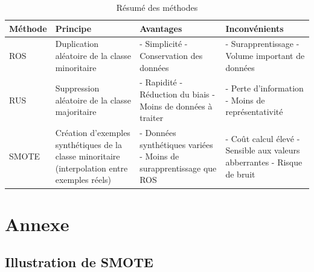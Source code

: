 \documentclass{article}
\begin{document}
\begin{table}[h!]
\centering
\begin{tabular}{|p{1.5cm}|p{4cm}|p{4.5cm}|p{4.2cm}|}
\hline

\centering
\textbf{Méthode} & \textbf{Principe} & \textbf{Avantages} & \textbf{Inconvénients} \\ \hline

\centering
ROS &
Duplication aléatoire de la classe minoritaire &
- Simplicité \newline
- Conservation des données &
- Surapprentissage \newline
- Volume important de \newline données \\ \hline


\centering
RUS &
Suppression aléatoire de la classe majoritaire &
- Rapidité \newline
- Réduction du biais \newline
- Moins de données à traiter &
- Perte d’information \newline
- Moins de représentativité \\ \hline

\centering
SMOTE &
Création d'exemples synthétiques de la classe minoritaire (interpolation entre exemples réels) &
- Données synthétiques \newline variées \newline
- Moins de surapprentissage que ROS &
- Coût calcul élevé \newline
- Sensible aux valeurs \newline abberrantes \newline
- Risque de bruit \\ \hline
\end{tabular}
\caption{Résumé des méthodes}\label{tab:methode}
\end{table}


\newpage

\section{Annexe}

\subsection{Illustration de SMOTE}
\end{document}
